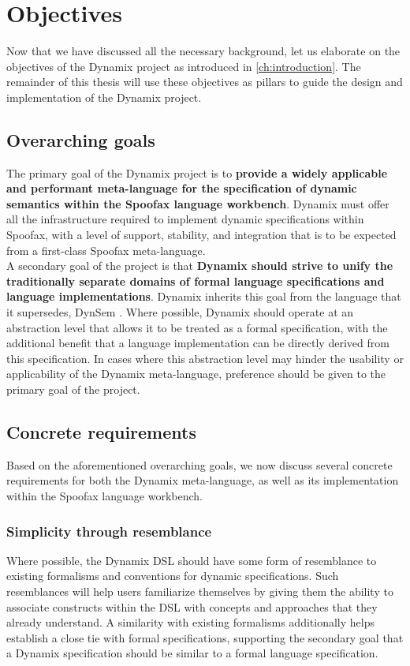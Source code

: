
\chapter{Objectives}
\label{ch:design_requirements}
Now that we have discussed all the necessary background, let us elaborate on the objectives of the Dynamix project as introduced in \cref{ch:introduction}. The remainder of this thesis will use these objectives as pillars to guide the design and implementation of the Dynamix project.

\section{Overarching goals}
The primary goal of the Dynamix project is to \textbf{provide a widely applicable and performant meta-language for the specification of dynamic semantics within the Spoofax language workbench}. Dynamix must offer all the infrastructure required to implement dynamic specifications within Spoofax, with a level of support, stability, and integration that is to be expected from a first-class Spoofax meta-language.\\

A secondary goal of the project is that \textbf{Dynamix should strive to unify the traditionally separate domains of formal language specifications and language implementations}. Dynamix inherits this goal from the language that it supersedes, DynSem \cite{VerguNV15}. Where possible, Dynamix should operate at an abstraction level that allows it to be treated as a formal specification, with the additional benefit that a language implementation can be directly derived from this specification. In cases where this abstraction level may hinder the usability or applicability of the Dynamix meta-language, preference should be given to the primary goal of the project.

\section{Concrete requirements}
Based on the aforementioned overarching goals, we now discuss several concrete requirements for both the Dynamix meta-language, as well as its implementation within the Spoofax language workbench.


\subsection*{Simplicity through resemblance}
Where possible, the Dynamix \ac{DSL} should have some form of resemblance to existing formalisms and conventions for dynamic specifications. Such resemblances will help users familiarize themselves by giving them the ability to associate constructs within the \ac{DSL} with concepts and approaches that they already understand. A similarity with existing formalisms additionally helps establish a close tie with formal specifications, supporting the secondary goal that a Dynamix specification should be similar to a formal language specification.

